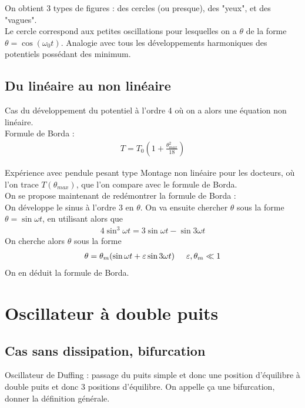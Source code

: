 \documentclass[12pt,prb,aps,epsf]{article}
\begin{document}
	On obtient 3 types de figures : des cercles (ou presque), des "yeux", et des "vagues".\\
	Le cercle correspond aux petites oscillations pour lesquelles on a $\theta$ de la forme $\theta = \cos(\omega_0 t)$. Analogie avec tous les développements harmoniques des potentiels possédant des minimum.\\
	
\subsection{Du linéaire au non linéaire}
	Cas du développement du potentiel à l'ordre 4 où on a alors une équation non linéaire.\\
	Formule de Borda :
	\begin{eqnarray}
	T = T_0\left(1 + \frac{\theta_{max}^2}{18}\right)
	\end{eqnarray}
	
	Expérience avec pendule pesant type Montage non linéaire pour les docteurs, où l'on trace $T(\theta_{max})$, que l'on compare avec le formule de Borda.\\
	
	On se propose maintenant de redémontrer la formule de Borda :\\
	On développe le sinus à l'ordre 3 en $\theta$. On va ensuite chercher $\theta$ sous la forme $\theta = \sin\omega t$, en utilisant alors que 
	\begin{eqnarray}
	4\sin^3\omega t = 3\sin \omega t - \sin 3\omega t
	\end{eqnarray}
	On cherche alors $\theta$ sous la forme
	\begin{eqnarray}
	\theta = \theta_m(\sin\omega t + \varepsilon\sin 3\omega t)\hspace{0.5cm}\varepsilon, \theta_m \ll 1
	\end{eqnarray}
	On en déduit la formule de Borda.
	
\section{Oscillateur à double puits}
\subsection{Cas sans dissipation, bifurcation}
Oscillateur de Duffing : passage du puits simple et donc une position d'équilibre à double puits et donc 3 positions d'équilibre. On appelle ça une bifurcation, donner la définition générale.\\
\end{document}
